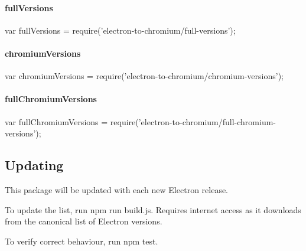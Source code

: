 \paragraph*{{\ttfamily full\+Versions}}


\begin{DoxyCode}
var fullVersions = require('electron-to-chromium/full-versions');
\end{DoxyCode}


\paragraph*{{\ttfamily chromium\+Versions}}


\begin{DoxyCode}
var chromiumVersions = require('electron-to-chromium/chromium-versions');
\end{DoxyCode}


\paragraph*{{\ttfamily full\+Chromium\+Versions}}


\begin{DoxyCode}
var fullChromiumVersions = require('electron-to-chromium/full-chromium-versions');
\end{DoxyCode}


\subsection*{Updating}

This package will be updated with each new Electron release.

To update the list, run {\ttfamily npm run build.\+js}. Requires internet access as it downloads from the canonical list of Electron versions.

To verify correct behaviour, run {\ttfamily npm test}. 